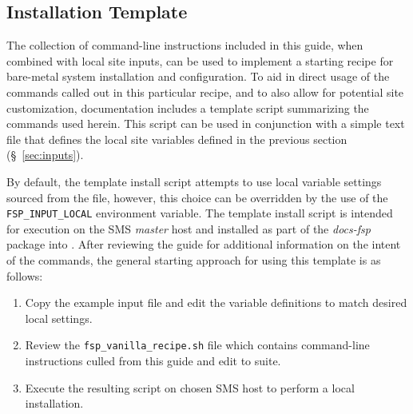 \subsection{Installation Template}
The collection of command-line instructions included in this guide, when
combined with local site inputs, can be used to implement a starting recipe for
bare-metal system installation and configuration. To aid in direct usage of the
commands called out in this particular recipe, and to also allow for potential
site customization, \FSP{} documentation includes a template script summarizing
the commands used herein. This script can be used in conjunction with a simple
text file that defines the local site variables defined in the previous section
(\S~\ref{sec:inputs}).

By default, the template install script attempts to use local variable settings sourced
from the  file, however, this choice can be
overridden by the use of the \texttt{FSP\_INPUT\_LOCAL} environment
variable. The template install script is intended for execution on the SMS {\em
  master} host and installed as part of the {\em docs-fsp} package into
.  After reviewing the guide
for additional information on the intent of the commands, the general starting
approach for using this template is as follows:

\begin{enumerate}[rightmargin=2cm,itemsep=-0.5ex]
\item Copy the  example input file and edit the
  variable definitions to match desired local settings.
\item Review the \texttt{fsp\_vanilla\_recipe.sh} file which contains
  command-line instructions culled from this guide and edit to suite.
\item Execute the resulting script on chosen SMS host to perform a local installation.
\end{enumerate}



